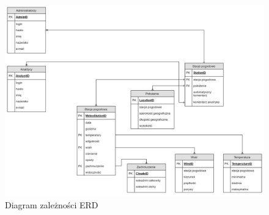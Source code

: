 \documentclass[12pt,a4paper]{article}
\begin{document}
\begin{figure}[!htb]
\includegraphics[width=\textwidth]{./figures/diagram_zwiazkow.png}
\caption{Diagram zależności ERD}
\end{figure}
\end{document}
